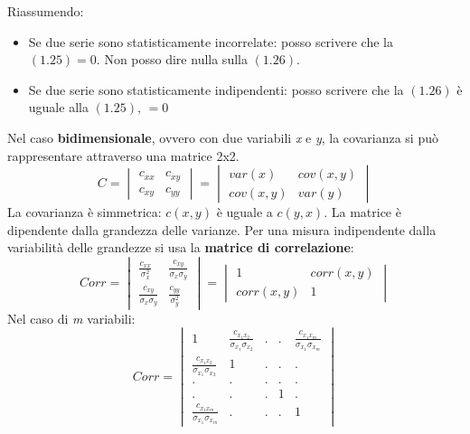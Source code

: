 Riassumendo:
\begin{itemize}
	\item Se due serie sono statisticamente incorrelate: posso scrivere che la $(1.25) = 0$. Non posso dire nulla sulla $(1.26)$.
	\item Se due serie sono statisticamente indipendenti: posso scrivere che la $(1.26)$ è uguale alla $(1.25)$, $=0$ 
\end{itemize}
Nel caso \textbf{bidimensionale}, ovvero con due variabili \textit{x} e \textit{y}, la covarianza si può rappresentare attraverso una matrice 2x2.
\begin{equation}
	C =
	\begin{vmatrix}
		c_{xx} & c_{xy} \\
		c_{xy} & c_{yy}
	\end{vmatrix}
	=
	\begin{vmatrix}
		var(x) & cov(x, y) \\
		cov(x, y) & var(y)
	\end{vmatrix}
\end{equation}
La covarianza è simmetrica: $c(x, y)$ è uguale a $c(y, x)$.
La matrice è dipendente dalla grandezza delle varianze.
Per una misura indipendente dalla variabilità delle grandezze si usa la \textbf{matrice di correlazione}:
\begin{equation}
Corr =
\begin{vmatrix}
\frac{c_{xx}}{\sigma_x^2} & \frac{c_{xy}}{\sigma_x \sigma_y}  \\
\frac{c_{xy}}{\sigma_x \sigma_y} & \frac{c_{yy}}{\sigma_y^2}
\end{vmatrix}
=
\begin{vmatrix}
1 & corr(x, y) \\
corr(x, y) & 1
\end{vmatrix}
\end{equation}
Nel caso di \textit{m} variabili:
\begin{equation}
	Corr =
	\begin{vmatrix}
		1 & \frac{c_{x_1x_2}}{\sigma_{x_1} \sigma_{x_2}} & . & .  & \frac{c_{x_1x_m}}{\sigma_{x_1} \sigma_{x_m}}  \\
		\frac{c_{x_1x_2}}{\sigma_{x_1} \sigma_{x_2}}  & 1 & . & . & . \\
		. & . & . & . & . \\ 
		. & . & . & 1 & . \\		
		 \frac{c_{x_1 x_m}}{\sigma_{x_1} \sigma_{x_m}} & . & . & . & 1
	\end{vmatrix}
\end{equation}


